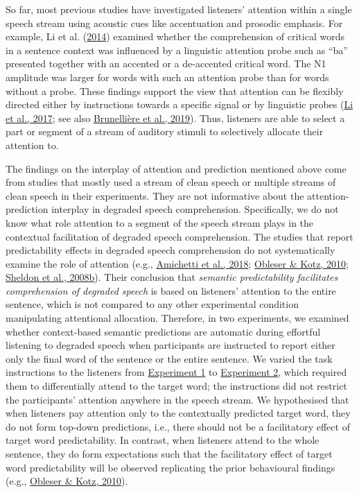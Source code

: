 \documentclass[a4paper, nobind]{templates/ociamthesis}
\begin{document}
So far, most previous studies have investigated listeners' attention within a single speech stream using acoustic cues like accentuation and prosodic emphasis.
For example, Li et al. (\protect\hyperlink{ref-Li2014}{2014}) examined whether the comprehension of critical words in a sentence context was influenced by a linguistic attention probe such as ``ba'' presented together with an accented or a de-accented critical word.
The N1 amplitude was larger for words with such an attention probe than for words without a probe.
These findings support the view that attention can be flexibly directed either by instructions towards a specific signal or by linguistic probes (\protect\hyperlink{ref-Li2017}{Li et al., 2017}; see also \protect\hyperlink{ref-Brunelliere2019}{Brunellière et al., 2019}).
Thus, listeners are able to select a part or segment of a stream of auditory stimuli to selectively allocate their attention to.

The findings on the interplay of attention and prediction mentioned above come from studies that mostly used a stream of clean speech or multiple streams of clean speech in their experiments.
They are not informative about the attention-prediction interplay in degraded speech comprehension.
Specifically, we do not know what role attention to a segment of the speech stream plays in the contextual facilitation of degraded speech comprehension.
The studies that report predictability effects in degraded speech comprehension do not systematically examine the role of attention (e.g., \protect\hyperlink{ref-Amichetti2018}{Amichetti et al., 2018}; \protect\hyperlink{ref-Obleser2010}{Obleser \& Kotz, 2010}; \protect\hyperlink{ref-Sheldon2008b}{Sheldon et al., 2008b}).
Their conclusion that \emph{semantic predictability facilitates comprehension of degraded speech} is based on listeners' attention to the entire sentence,
which is not compared to any other experimental condition manipulating attentional allocation.
Therefore, in two experiments, we examined whether context-based semantic predictions are automatic during effortful listening to degraded speech when participants are instructed to report either only the final word of the sentence or the entire sentence.
We varied the task instructions to the listeners from \protect\hyperlink{experiment1a}{Experiment 1} to \protect\hyperlink{experiment1b}{Experiment 2}, which required them to differentially attend to the target word;
the instructions did not restrict the participants' attention anywhere in the speech stream.
We hypothesised that when listeners pay attention only to the contextually predicted target word, they do not form top-down predictions, i.e., there should not be a facilitatory effect of target word predictability.
In contrast, when listeners attend to the whole sentence, they do form expectations such that the facilitatory effect of target word predictability will be observed replicating the prior behavioural findings (e.g., \protect\hyperlink{ref-Obleser2010}{Obleser \& Kotz, 2010}).
\end{document}
